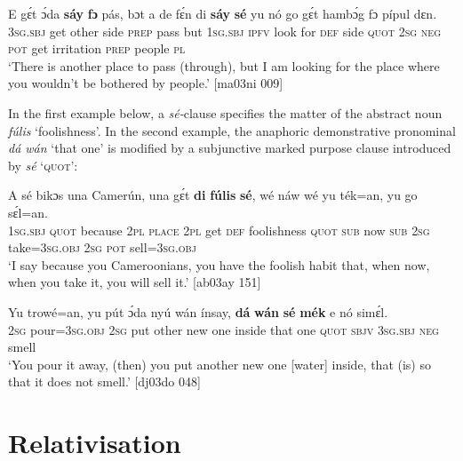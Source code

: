 \ea%
    \label{ex:key:1417}
    \gll E    gɛ́t  ɔ́da    \textbf{sáy}    \textbf{fɔ}  pás,    bɔt  a    de  fɛ́n
di  \textbf{sáy}    \textbf{sé}    yu    nó  go  gɛ́t  hambɔ́g    fɔ  pípul  dɛn.\\
\textsc{3sg.sbj}  get  other  side    \textsc{prep}  pass    but  \textsc{1sg.sbj}  \textsc{ipfv}  {look for}  
\textsc{def}  side    \textsc{quot}   \textsc{2sg}    \textsc{neg}  \textsc{pot}  get  irritation  \textsc{prep}  people  \textsc{pl}\\

\glt ‘There is another place to pass (through), but I am looking for the place where you
wouldn’t be bothered by people.’ [ma03ni 009]
\z

In the first example below, a \textit{sé-}clause specifies the matter of the abstract noun \textit{fúlis} ‘foolishness’. In the second example, the anaphoric demonstrative pronominal \textit{dá wán} ‘that one’ is modified by a subjunctive marked purpose clause introduced by \textit{sé} ‘\textsc{quot}’:


\ea%
    \label{ex:key:1418}
    \gll A    sé    bikɔs  una  Camerún,  una  gɛ́t  \textbf{di}  \textbf{fúlis}      \textbf{sé},
wé  náw    wé  yu  ték=an,    yu  go  sɛ́l=an.\\
\textsc{1sg.sbj}  \textsc{quot}    because  \textsc{2pl}  \textsc{place}    \textsc{2pl}  get  \textsc{def}  foolishness  \textsc{quot}
\textsc{sub}  now    \textsc{sub}  \textsc{2sg}  take=\textsc{3sg.obj}  \textsc{2sg}  \textsc{pot}  sell=\textsc{3sg.obj}\\

\glt ‘I say because you Cameroonians, you have the foolish habit that, when now, 
when you take it, you will sell it.’ [ab03ay 151]
\z


\ea%
    \label{ex:key:1419}
    \gll Yu  trowé=an,  yu  pút  ɔ́da    nyú  wán    ínsay,
\textbf{dá}  \textbf{wán}    \textbf{sé}    \textbf{mék}    e    nó  simɛ́l.\\
\textsc{2sg}  pour=\textsc{3sg.obj}  \textsc{2sg}  put  other  new  one    inside
that  one    \textsc{quot}    \textsc{sbjv}    \textsc{3sg.sbj}  \textsc{neg}  smell\\

\glt ‘You pour it away, (then) you put another new one [water] inside, 
that (is) so that it does not smell.’ [dj03do 048]
\z

\section{Relativisation}\label{sec:10.6}

